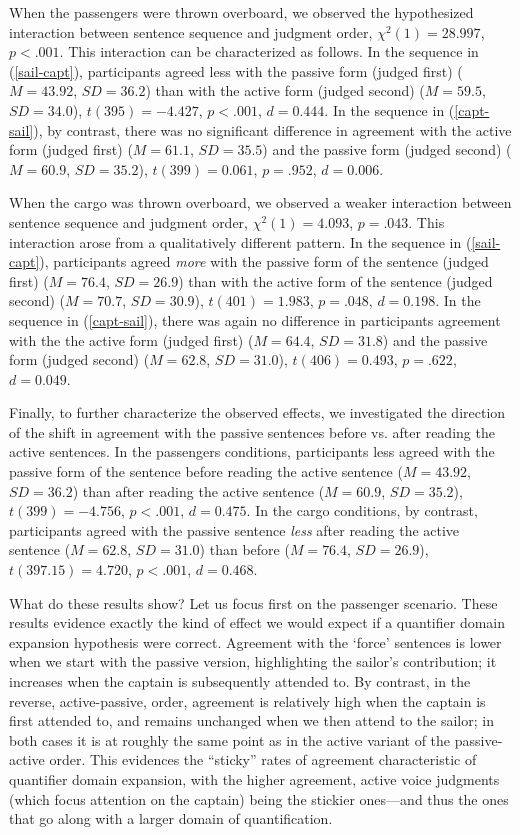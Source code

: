 \documentclass{salt}
\newcommand{\reff}[1]{(\ref{#1})}
\begin{document}
When the passengers were thrown overboard, we observed the hypothesized interaction between sentence sequence and judgment order, $\chi^2(1)=28.997$, $p<.001$. This interaction can be characterized as follows. In the sequence in \reff{sail-capt}, participants agreed less with the passive form (judged first) ($M=43.92$, $SD=36.2$) than with the active form (judged second) ($M=59.5$, $SD=34.0$), $t(395) = -4.427$, $p<.001$, $d=0.444$. In the sequence in \reff{capt-sail}, by contrast, there was no significant difference in agreement with the active form (judged first) ($M=61.1$, $SD=35.5$) and the passive form (judged second) ($M=60.9$, $SD=35.2$), $t(399) = 0.061$, $p=.952$, $d=0.006$.

When the cargo was thrown overboard, we observed a weaker interaction between sentence sequence and judgment order, $\chi^2(1)=4.093$, $p=.043$. This interaction arose from a qualitatively different pattern. In the sequence in \reff{sail-capt}, participants agreed \textit{more} with the passive form of the sentence (judged first) ($M=76.4$, $SD=26.9$) than with the active form of the sentence (judged second) ($M=70.7$, $SD=30.9$), $t(401) = 1.983$, $p=.048$, $d=0.198$. In the sequence in \reff{capt-sail}, there was again no difference in participants agreement with the the active form (judged first) ($M=64.4$, $SD=31.8$) and the passive form (judged second) ($M=62.8$, $SD=31.0$), $t(406) = 0.493$, $p=.622$, $d=0.049$.

Finally, to further characterize the observed effects, we investigated the direction of the shift in agreement with the passive sentences before vs. after reading the active sentences. In the passengers conditions, participants less agreed with the passive form of the sentence before reading the active sentence ($M=43.92$, $SD=36.2$) than after reading the active sentence ($M=60.9$, $SD=35.2$), $t(399) = -4.756$, $p<.001$, $d=0.475$. In the cargo conditions, by contrast, participants agreed with the passive sentence \textit{less} after reading the active sentence ($M=62.8$, $SD=31.0$) than before ($M=76.4$, $SD=26.9$), $t(397.15) = 4.720$, $p<.001$, $d=0.468$.

What do these results show? Let us focus first on the passenger scenario. These results evidence exactly the kind of effect we would expect if a quantifier domain expansion hypothesis were correct. Agreement with the `force' sentences is lower when we start with the passive version, highlighting the sailor's contribution; it increases when the captain is subsequently attended to. By contrast, in the reverse, active-passive, order, agreement is relatively high when the captain is first attended to, and remains unchanged when we then attend to the sailor; in both cases it is at roughly the same point as in the active variant of the passive-active order. This evidences the ``sticky'' rates of agreement characteristic of quantifier domain expansion, with the higher agreement, active voice judgments (which focus attention on the captain) being the stickier ones---and thus the ones that go along with a larger domain of quantification. 
\end{document}
